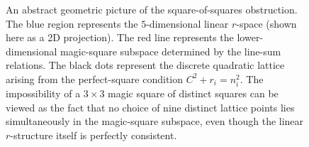 \documentclass[12pt]{article}
\begin{document}
\begin{figure}[H]
\centering
{}

\caption{An abstract geometric picture of the square-of-squares obstruction.
The blue region represents the $5$-dimensional linear $r$-space (shown here as
a 2D projection).  The red line represents the lower-dimensional magic-square
subspace determined by the line-sum relations.  The black dots represent the
discrete quadratic lattice arising from the perfect-square condition
$C^2 + r_i = n_i^2$.  The impossibility of a $3\times 3$ magic square of
distinct squares can be viewed as the fact that no choice of nine distinct
lattice points lies simultaneously in the magic-square subspace, even though
the linear $r$-structure itself is perfectly consistent.}
\label{fig:5d-rspace-lattice}
\end{figure}
\end{document}
